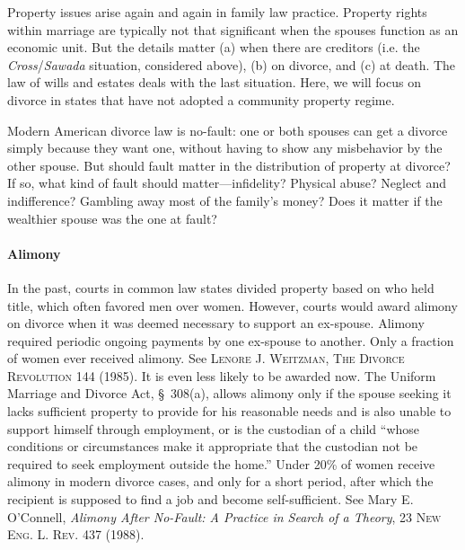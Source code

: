 Property issues arise again and again in family law practice. Property rights
within marriage are typically not that significant when the spouses function as
an economic unit. But the details matter (a) when there are creditors (i.e. the
\textit{Cross}/\textit{Sawada} situation, considered above), (b) on divorce,
and (c) at death. The law of wills and estates deals with the last situation.
Here, we will focus on divorce in states that have not adopted a community
property regime.


Modern American divorce law is no-fault: one or both spouses can get a divorce
simply because they want one, without having to show any misbehavior by the
other spouse. But should fault matter in the distribution of property at
divorce? If so, what kind of fault should matter---infidelity? Physical
abuse? Neglect and indifference? Gambling away most of the family's money?
Does it matter if the wealthier spouse was the one at fault?

\paragraph{Alimony} In the past, courts in common law states divided property
based on who held title, which often favored men over women. However, courts
would award alimony on divorce when it was deemed necessary to support an
ex-spouse. Alimony required periodic ongoing payments by one ex-spouse to
another. Only a fraction of women ever received alimony. See \textsc{Lenore J.
Weitzman, The Divorce Revolution} 144 (1985). It is even less likely to be
awarded now. The Uniform Marriage and Divorce Act, \S~308(a), allows alimony
only if the spouse seeking it lacks sufficient property to provide for his
reasonable needs and is also unable to support himself through employment, or
is the custodian of a child ``whose conditions or circumstances make it
appropriate that the custodian not be required to seek employment outside the
home.'' Under 20\% of women receive alimony in modern divorce cases, and only
for a short period, after which the recipient is supposed to find a job and
become self-sufficient. See Mary E. O'Connell, \textit{Alimony After No-Fault:
A Practice in Search of a Theory}, 23 \textsc{New Eng. L. Rev.} 437 (1988).

